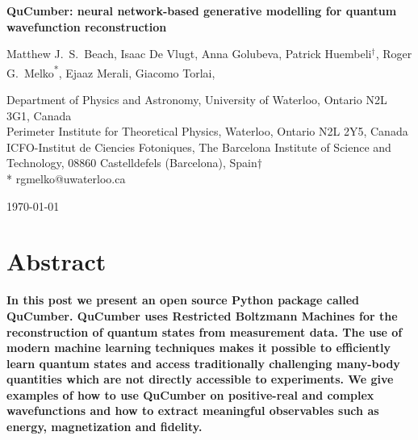 \documentclass[submission, Phys]{SciPost}
\begin{document}
\begin{center}{\Large \textbf{
QuCumber: neural network-based generative modelling for quantum wavefunction reconstruction
}}\end{center}

\begin{center}
Matthew J.~S.~Beach,
Isaac De Vlugt,
Anna Golubeva,
Patrick Huembeli$^\dag$,
Roger G.~Melko\textsuperscript{*},
Ejaaz Merali,
Giacomo Torlai,
\end{center}

\begin{center}
Department of Physics and Astronomy, University of Waterloo, Ontario N2L 3G1, Canada
\\
Perimeter Institute for Theoretical Physics, Waterloo, Ontario N2L 2Y5, Canada
ICFO-Institut  de  Ciencies  Fotoniques,  The  Barcelona  Institute  of Science  and  Technology, 08860  Castelldefels  (Barcelona),  Spain$\dag$ \\
* rgmelko@uwaterloo.ca \\
\end{center}

\begin{center}
\today
\end{center}


\section*{Abstract}
{\bf
In this post we present an open source Python package called QuCumber. 
QuCumber uses Restricted Boltzmann Machines for the reconstruction of quantum states 
from measurement data. The use of modern machine learning techniques makes it possible 
to efficiently learn quantum states and access traditionally challenging many-body quantities 
which are not directly accessible to experiments. We give examples of how to use QuCumber 
on positive-real and complex wavefunctions and how to extract meaningful observables such as 
energy, magnetization and fidelity.
}
\end{document}
